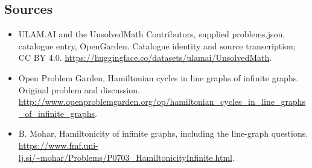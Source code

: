 \documentclass[11pt,a4paper]{article}
\begin{document}
\subsection{Sources}
\begin{itemize}
\item[S1] ULAM.AI and the UnsolvedMath Contributors, supplied problems.json, catalogue entry, OpenGarden. Catalogue identity and source transcription; CC BY 4.0.
\url{https://huggingface.co/datasets/ulamai/UnsolvedMath}.
\item[S2] Open Problem Garden, Hamiltonian cycles in line graphs of infinite graphs. Original problem and discussion.
\url{http://www.openproblemgarden.org/op/hamiltonian_cycles_in_line_graphs_of_infinite_graphs}.
\item[S3] B. Mohar, Hamiltonicity of infinite graphs, including the line-graph questions.
\url{https://www.fmf.uni-lj.si/~mohar/Problems/P0703_HamiltonicityInfinite.html}.
\end{itemize}
\end{document}

